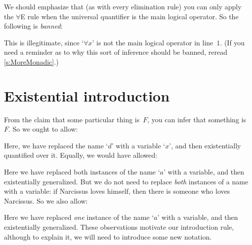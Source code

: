We should emphasize that (as with every elimination rule) you can only apply the $\forall$E rule when the universal quantifier is the main logical operator. So the following is \emph{banned}:
\begin{fitchproof}
	\PR
\end{fitchproof}
This is illegitimate, since `$\forall x$' is not the main logical operator in line~$1$. (If you need a reminder as to why this sort of inference should be banned, reread \cref{s:MoreMonadic}.)

\section{Existential introduction}\label{s:existsIntro}

From the claim that some particular thing is~$F$, you can infer that something is~$F$. So we ought to allow:
\begin{fitchproof}
	\PR
	 
\end{fitchproof}
Here, we have replaced the name `$d$' with a variable `$x$', and then existentially quantified over it. Equally, we would have allowed:
\begin{fitchproof}
	\PR
	 
\end{fitchproof}
Here we have replaced both instances of the name `$a$' with a variable, and then existentially generalized. But we do not need to replace \emph{both} instances of a name with a variable: if Narcissus loves himself, then there is someone who loves Narcissus. So we also allow:
\begin{fitchproof}
	\PR
	 
\end{fitchproof}
Here we have replaced \emph{one} instance of the name `$a$' with a variable, and then existentially generalized. These observations motivate our introduction rule, although to explain it, we will need to introduce some new notation.

